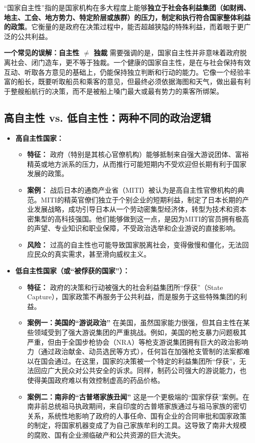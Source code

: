 “国家自主性”指的是国家机构在多大程度上能够\textbf{独立于社会各利益集团（如财阀、地主、工会、地方势力、特定阶层或族群）的压力，制定和执行符合国家整体利益的政策}。它衡量的是政府在决策过程中，能否超越狭隘的特殊利益，而着眼于更广泛的公共利益。

\textbf{一个常见的误解：自主性 $\neq$ 独裁}
需要强调的是，国家自主性并非意味着政府脱离社会、闭门造车，更不等于独裁。一个健康的国家自主性，是在与社会保持有效互动、听取各方意见的基础上，仍能保持独立判断和行动的能力。它像一个经验丰富的船长，既要听取船员和乘客的意见，但最终必须依据海图和天气，做出最有利于整艘船航行的决策，而不是被船上嗓门最大或最有势力的乘客所绑架。

\subsection{高自主性 vs. 低自主性：两种不同的政治逻辑}

\begin{itemize}
    \item \textbf{高自主性国家：}
    \begin{itemize}
        \item \textbf{特征：} 政府（特别是其核心官僚机构）能够抵制来自强大游说团体、富裕精英或地方派系的压力，从而推行可能短期内不受欢迎但长期有利于国家发展的政策。
        \item \textbf{案例：} 战后日本的通商产业省（MITI）被认为是高自主性官僚机构的典范。MITI的精英官僚们独立于个别企业的短期利益，制定了日本长期的产业发展战略，成功引导日本从一个劳动密集型经济体，转型为技术和资本密集型的高科技强国。他们能够做到这一点，是因为MITI的官员拥有极高的声望、专业知识和职业保障，不受政治选举和企业游说的直接影响。
        \item \textbf{风险：} 过高的自主性也可能导致国家脱离社会，变得傲慢和僵化，无法回应民众的真实需求，甚至滑向威权主义。
    \end{itemize}
    \item \textbf{低自主性国家（或“被俘获的国家”）：}
    \begin{itemize}
        \item \textbf{特征：} 政府的决策和行动被强大的社会利益集团所“俘获”（State Capture），国家政策不再服务于公共利益，而是服务于这些特殊集团的利益。
        \item \textbf{案例一：美国的“游说政治”}
        在美国，虽然国家能力很强，但其自主性在某些领域受到了强大游说集团的严重挑战。例如，美国的枪支暴力问题极其严重，但由于全国步枪协会（NRA）等枪支游说集团拥有巨大的政治影响力（通过政治献金、动员选民等方式），任何旨在加强枪支管制的法案都难以在国会通过。在这里，国家的决策被一个特定的利益集团所“俘获”，无法回应广大民众对公共安全的诉求。同样，制药公司强大的游说能力，也使得美国政府难以有效控制虚高的药品价格。
        \item \textbf{案例二：南非的“古普塔家族丑闻”}
        这是一个更极端的“国家俘获”案例。在南非前总统祖马执政期间，来自印度的古普塔家族通过与祖马家族的密切关系，系统性地影响了政府的人事任命、国有企业的合同审批和国家政策的制定，将国家机器变成了为自己家族牟利的工具。这导致了南非大规模的腐败、国有企业濒临破产和公共资源的巨大流失。
    \end{itemize}
\end{itemize}

